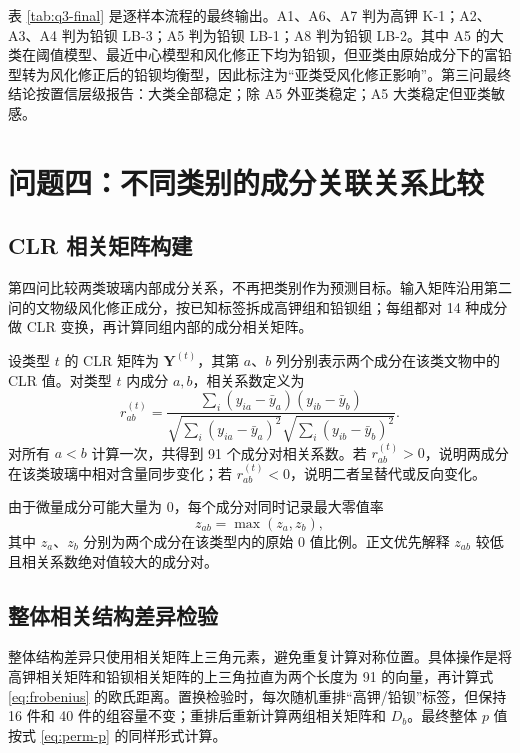 \documentclass[UTF8,zihao=-4,a4paper,fontset=fandol]{ctexart}
\begin{document}
表 \ref{tab:q3-final} 是逐样本流程的最终输出。A1、A6、A7 判为高钾 K-1；A2、A3、A4 判为铅钡 LB-3；A5 判为铅钡 LB-1；A8 判为铅钡 LB-2。其中 A5 的大类在阈值模型、最近中心模型和风化修正下均为铅钡，但亚类由原始成分下的富铅型转为风化修正后的铅钡均衡型，因此标注为“亚类受风化修正影响”。第三问最终结论按置信层级报告：大类全部稳定；除 A5 外亚类稳定；A5 大类稳定但亚类敏感。

\section{问题四：不同类别的成分关联关系比较}

\subsection{CLR 相关矩阵构建}

第四问比较两类玻璃内部成分关系，不再把类别作为预测目标。输入矩阵沿用第二问的文物级风化修正成分，按已知标签拆成高钾组和铅钡组；每组都对 14 种成分做 CLR 变换，再计算同组内部的成分相关矩阵。

设类型 $t$ 的 CLR 矩阵为 $\bm Y^{(t)}$，其第 $a$、$b$ 列分别表示两个成分在该类文物中的 CLR 值。对类型 $t$ 内成分 $a,b$，相关系数定义为
\begin{equation}
  r_{ab}^{(t)}=
  \frac{\sum_i(y_{ia}-\bar y_a)(y_{ib}-\bar y_b)}
  {\sqrt{\sum_i(y_{ia}-\bar y_a)^2}\sqrt{\sum_i(y_{ib}-\bar y_b)^2}}.
  \label{eq:corr}
\end{equation}
对所有 $a<b$ 计算一次，共得到 91 个成分对相关系数。若 $r_{ab}^{(t)}>0$，说明两成分在该类玻璃中相对含量同步变化；若 $r_{ab}^{(t)}<0$，说明二者呈替代或反向变化。

由于微量成分可能大量为 0，每个成分对同时记录最大零值率
\begin{equation}
  z_{ab}=\max(z_a,z_b),
  \label{eq:zero-rate}
\end{equation}
其中 $z_a$、$z_b$ 分别为两个成分在该类型内的原始 0 值比例。正文优先解释 $z_{ab}$ 较低且相关系数绝对值较大的成分对。

\subsection{整体相关结构差异检验}

整体结构差异只使用相关矩阵上三角元素，避免重复计算对称位置。具体操作是将高钾相关矩阵和铅钡相关矩阵的上三角拉直为两个长度为 91 的向量，再计算式 \eqref{eq:frobenius} 的欧氏距离。置换检验时，每次随机重排“高钾/铅钡”标签，但保持 16 件和 40 件的组容量不变；重排后重新计算两组相关矩阵和 $D_b$。最终整体 $p$ 值按式 \eqref{eq:perm-p} 的同样形式计算。
\end{document}
